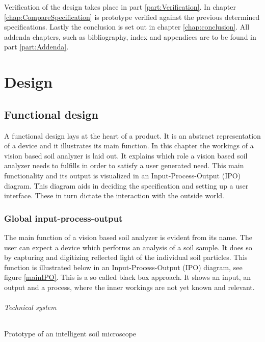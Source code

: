 \documentclass[11pt,fleqn,,a4paper,twoside,openright]{book}
\begin{document}
Verification of the design takes place in part \ref{part:Verification}. In chapter \ref{chap:CompareSpecification} is prototype verified against the previous determined specifications. Lastly the conclusion is set out in chapter \ref{chap:conclusion}. All addenda chapters, such as bibliography, index and appendices are to be found in part \ref{part:Addenda}. 

\part{Design}\label{part:Design}

\chapter{Functional design}\label{chap:FunctionalDesiging}
A functional design lays at the heart of a product. It is an abstract representation of a device and it illustrates its main function. In this chapter the workings of a vision based soil analyzer is laid out. It explains which role a vision based soil analyzer needs to fulfills in order to satisfy a user generated need. This main functionality and its output is visualized in an Input-Process-Output (IPO) diagram. This diagram aids in deciding the specification and setting up a user interface. These in turn dictate the interaction with the outside world.

\section{Global input-process-output}
The main function of a vision based soil analyzer is evident from its name. The user can expect a device which performs an analysis of a soil sample. It does so by capturing and digitizing reflected light of the individual soil particles. This function is illustrated below in an Input-Process-Output (IPO) diagram, see figure \ref{mainIPO}. This is a so called black box approach. It shows an input, an output and a process, where the inner workings are not yet known and relevant.   
\paragraph{Technical system}
\begin{sBox}
	Prototype of an intelligent soil microscope
\end{sBox}
\end{document}
